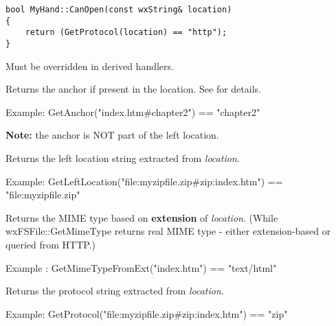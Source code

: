 \begin{verbatim}
bool MyHand::CanOpen(const wxString& location) 
{
    return (GetProtocol(location) == "http");
}
\end{verbatim}

Must be overridden in derived handlers.

\label{wxfilesystemhandlergetanchor}


Returns the anchor if present in the location.
See  for details.

Example: GetAnchor("index.htm\#chapter2") == "chapter2"

{\bf Note:} the anchor is NOT part of the left location.

\label{wxfilesystemhandlergetleftlocation}


Returns the left location string extracted from {\it location}. 

Example: GetLeftLocation("file:myzipfile.zip\#zip:index.htm") == "file:myzipfile.zip"

\label{wxfilesystemhandlergetmimetypefromext}


Returns the MIME type based on {\bf extension} of {\it location}. (While wxFSFile::GetMimeType
returns real MIME type - either extension-based or queried from HTTP.)

Example : GetMimeTypeFromExt("index.htm") == "text/html"

\label{wxfilesystemhandlergetprotocol}


Returns the protocol string extracted from {\it location}. 

Example: GetProtocol("file:myzipfile.zip\#zip:index.htm") == "zip"

\label{wxfilesystemhandlergetrightlocation}


